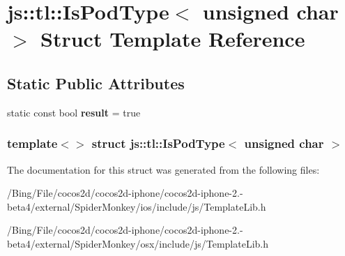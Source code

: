 \hypertarget{structjs_1_1tl_1_1_is_pod_type_3_01unsigned_01char_01_4}{\section{js\-:\-:tl\-:\-:Is\-Pod\-Type$<$ unsigned char $>$ Struct Template Reference}
\label{structjs_1_1tl_1_1_is_pod_type_3_01unsigned_01char_01_4}
}
\subsection*{Static Public Attributes}
\begin{DoxyCompactItemize}
\item 
\hypertarget{structjs_1_1tl_1_1_is_pod_type_3_01unsigned_01char_01_4_ae315b381fbd112a2e5b4f8064d3ba311}{static const bool {\bfseries result} = true}\label{structjs_1_1tl_1_1_is_pod_type_3_01unsigned_01char_01_4_ae315b381fbd112a2e5b4f8064d3ba311}

\end{DoxyCompactItemize}
\subsubsection*{template$<$$>$ struct js\-::tl\-::\-Is\-Pod\-Type$<$ unsigned char $>$}



The documentation for this struct was generated from the following files\-:\begin{DoxyCompactItemize}
\item 
/\-Bing/\-File/cocos2d/cocos2d-\/iphone/cocos2d-\/iphone-\/2.-\/beta4/external/\-Spider\-Monkey/ios/include/js/Template\-Lib.\-h\item 
/\-Bing/\-File/cocos2d/cocos2d-\/iphone/cocos2d-\/iphone-\/2.-\/beta4/external/\-Spider\-Monkey/osx/include/js/Template\-Lib.\-h\end{DoxyCompactItemize}
